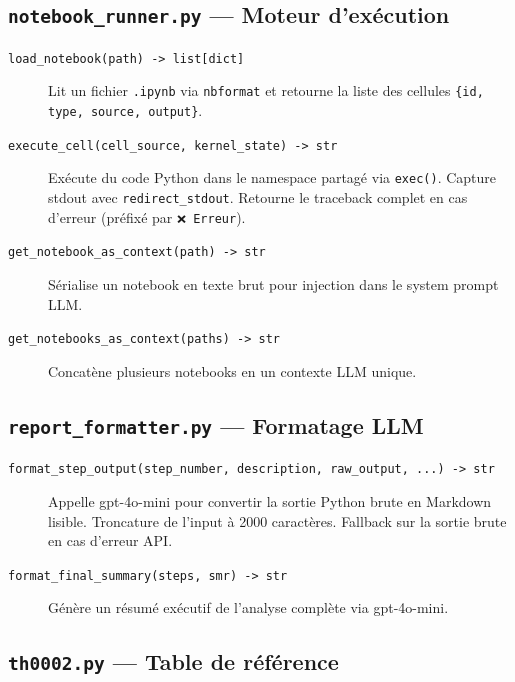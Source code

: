 \documentclass[11pt,a4paper]{article}
\begin{document}
\subsection{\texttt{notebook\_runner.py} — Moteur d'exécution}

\begin{description}
  \item[\texttt{load\_notebook(path) -> list[dict]}]
    Lit un fichier \texttt{.ipynb} via \texttt{nbformat} et retourne la liste
    des cellules \texttt{\{id, type, source, output\}}.

  \item[\texttt{execute\_cell(cell\_source, kernel\_state) -> str}]
    Exécute du code Python dans le namespace partagé via \texttt{exec()}.
    Capture stdout avec \texttt{redirect\_stdout}. Retourne le traceback
    complet en cas d'erreur (préfixé par \texttt{❌ Erreur}).

  \item[\texttt{get\_notebook\_as\_context(path) -> str}]
    Sérialise un notebook en texte brut pour injection dans le system prompt LLM.

  \item[\texttt{get\_notebooks\_as\_context(paths) -> str}]
    Concatène plusieurs notebooks en un contexte LLM unique.
\end{description}

\subsection{\texttt{report\_formatter.py} — Formatage LLM}

\begin{description}
  \item[\texttt{format\_step\_output(step\_number, description, raw\_output, ...) -> str}]
    Appelle gpt-4o-mini pour convertir la sortie Python brute en Markdown lisible.
    Troncature de l'input à 2000 caractères. Fallback sur la sortie brute en cas
    d'erreur API.

  \item[\texttt{format\_final\_summary(steps, smr) -> str}]
    Génère un résumé exécutif de l'analyse complète via gpt-4o-mini.
\end{description}

\subsection{\texttt{th0002.py} — Table de référence}
\end{document}
